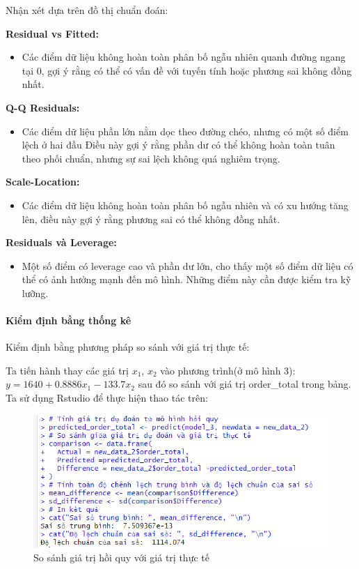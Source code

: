Nhận xét dựa trên đồ thị chuẩn đoán:

\textbf{Residual vs Fitted:}
\begin{itemize}
 \item Các điểm dữ liệu không hoàn toàn phân bố ngẫu nhiên quanh đường ngang tại 0, gợi ý rằng có thể có vấn đề với tuyến tính hoặc phương sai không đồng nhất. 
\end{itemize}
 \textbf{Q-Q Residuals:}
 \begin{itemize}
\item Các điểm dữ liệu phần lớn nằm dọc theo đường chéo, nhưng có một số điểm lệch ở hai đầu Điều này gợi ý rằng phần dư có thể không hoàn toàn tuân theo phối chuẩn, nhưng sự sai lệch không quá nghiêm trọng.
 \end{itemize}
\textbf{Scale-Location:}
\begin{itemize}
\item Các điểm dữ liệu không hoàn toàn phân bố ngẫu nhiên và có xu hướng tăng lên, điều này gợi ý rằng phương sai có thể không đồng nhất.
\end{itemize}
\textbf{Residuals và Leverage:}
\begin{itemize}
\item Một số điểm có leverage cao và phần dư lớn, cho thấy một số điểm dữ liệu  có thể có ảnh hưởng mạnh đến mô hình. Những điểm này cần được kiểm tra kỹ lưỡng.
\end{itemize}
\paragraph{Kiểm định bằng thống kê}

Kiểm định bằng phương pháp so sánh với giá trị thực tế:

Ta tiến hành thay các giá trị $x_1$, $x_2$ vào phương trình(ở mô hình 3): $y= 1640 + 0.8886x_1 - 133.7 x_2$ sau đó so sánh với giá trị order\_total trong bảng. Ta sử dụng Rstudio để thực hiện thao tác trên:

\begin{figure}[!htp]
  \centering
  \includegraphics[width=0.5\linewidth]{graphics/5.5.7.png}
  \caption{So sánh giá trị hồi quy với giá trị thực tế }
\end{figure}

